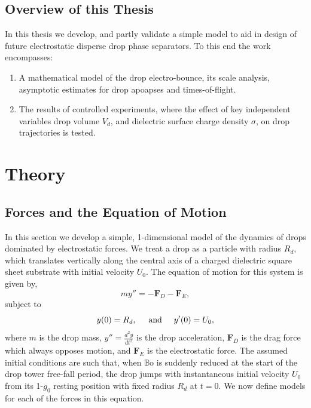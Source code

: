\documentclass[12pt,a4paper,oneside]{book}
\begin{document}
\section{Overview of this Thesis}
In this thesis we develop, and partly validate a simple model to aid in design of future electrostatic disperse drop phase separators. To this end the work encompasses:
\begin{enumerate}
\item A mathematical model of the drop electro-bounce, its scale analysis, asymptotic estimates for drop apoapses and times-of-flight.
\item The results of controlled experiments, where the effect of key independent variables drop volume $V_d$, and dielectric surface charge density $\sigma$, on drop trajectories is tested. 
\end{enumerate}

\chapter{Theory}
\section{Forces and the Equation of Motion}
In this section we develop a simple, 1-dimensional model of the dynamics of drops dominated by electrostatic forces. We treat a drop as a particle with radius $R_d$, which translates vertically along the central axis of a charged dielectric square sheet substrate with initial velocity $U_0$. The equation of motion for this system is given by,
\begin{equation}
m y'' = - \mathbf{F}_D - \mathbf{F}_E,
\label{gov_eqn}
\end{equation}
subject to
\begin{equation}
y(0) = R_d, \hspace{5 mm} \mbox{and} \hspace{5 mm} y'(0) = U_0,
\end{equation}
where $m$ is the drop mass, $y'' = \frac{d^2 y}{d t^2}$ is the drop acceleration, $\mathbf{F}_D$ is the drag force which always opposes motion, and $\mathbf{F}_E$ is the electrostatic force. The assumed initial conditions are such that, when $\mathbb{B}\mbox{o}$ is suddenly reduced at the start of the drop tower free-fall period, the drop jumps with instantaneous initial velocity $U_0$ from its 1-$g_0$ resting position with fixed radius $R_d$ at $t=0$. We now define models for each of the forces in this equation.
\end{document}
